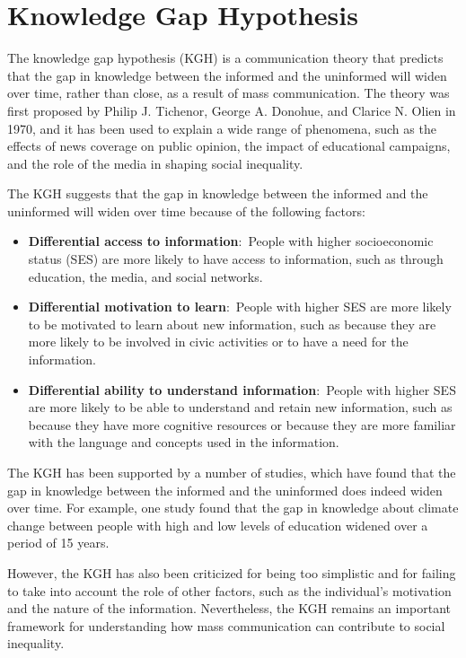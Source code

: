 \documentclass[
  b5paper]{book}
\begin{document}
\hypertarget{knowledge-gap-hypothesis}{%
\section{Knowledge Gap Hypothesis}\label{knowledge-gap-hypothesis}}

The knowledge gap hypothesis (KGH) is a communication theory that predicts that the gap in knowledge between the informed and the uninformed will widen over time, rather than close, as a result of mass communication. The theory was first proposed by Philip J. Tichenor, George A. Donohue, and Clarice N. Olien in 1970, and it has been used to explain a wide range of phenomena, such as the effects of news coverage on public opinion, the impact of educational campaigns, and the role of the media in shaping social inequality.

The KGH suggests that the gap in knowledge between the informed and the uninformed will widen over time because of the following factors:

\begin{itemize}
\item
  \textbf{Differential access to information}:~People with higher socioeconomic status (SES) are more likely to have access to information, such as through education, the media, and social networks.
\item
  \textbf{Differential motivation to learn}:~People with higher SES are more likely to be motivated to learn about new information, such as because they are more likely to be involved in civic activities or to have a need for the information.
\item
  \textbf{Differential ability to understand information}:~People with higher SES are more likely to be able to understand and retain new information, such as because they have more cognitive resources or because they are more familiar with the language and concepts used in the information.
\end{itemize}

The KGH has been supported by a number of studies, which have found that the gap in knowledge between the informed and the uninformed does indeed widen over time. For example, one study found that the gap in knowledge about climate change between people with high and low levels of education widened over a period of 15 years.

However, the KGH has also been criticized for being too simplistic and for failing to take into account the role of other factors, such as the individual's motivation and the nature of the information. Nevertheless, the KGH remains an important framework for understanding how mass communication can contribute to social inequality.
\end{document}

